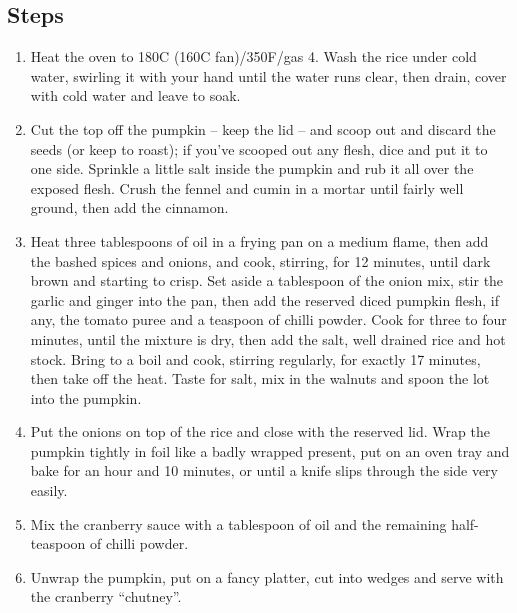 \documentclass{book}
\begin{document}
\subsection*{Steps}
\begin{enumerate}
\item Heat the oven to 180C (160C fan)/350F/gas 4. Wash the rice under cold water, swirling it with your hand until the water runs clear, then drain, cover with cold water and leave to soak.
\item Cut the top off the pumpkin – keep the lid – and scoop out and discard the seeds (or keep to roast); if you’ve scooped out any flesh, dice and put it to one side. Sprinkle a little salt inside the pumpkin and rub it all over the exposed flesh. Crush the fennel and cumin in a mortar until fairly well ground, then add the cinnamon.
\item Heat three tablespoons of oil in a frying pan on a medium flame, then add the bashed spices and onions, and cook, stirring, for 12 minutes, until dark brown and starting to crisp. Set aside a tablespoon of the onion mix, stir the garlic and ginger into the pan, then add the reserved diced pumpkin flesh, if any, the tomato puree and a teaspoon of chilli powder. Cook for three to four minutes, until the mixture is dry, then add the salt, well drained rice and hot stock. Bring to a boil and cook, stirring regularly, for exactly 17 minutes, then take off the heat. Taste for salt, mix in the walnuts and spoon the lot into the pumpkin.
\item Put the onions on top of the rice and close with the reserved lid. Wrap the pumpkin tightly in foil like a badly wrapped present, put on an oven tray and bake for an hour and 10 minutes, or until a knife slips through the side very easily.
\item Mix the cranberry sauce with a tablespoon of oil and the remaining half-teaspoon of chilli powder.
\item Unwrap the pumpkin, put on a fancy platter, cut into wedges and serve with the cranberry “chutney”.
\end{enumerate}
\newpage
\end{document}
